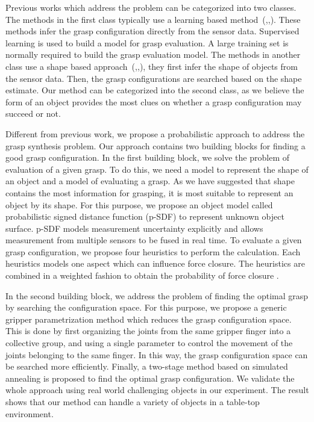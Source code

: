 Previous works which address the problem can be categorized into two classes. The methods in the first class typically use a learning based method~(\cite{Kroemer2010},\cite{Tegin2009},\cite{Stulp2011}). These methods infer the grasp configuration directly from the sensor data. Supervised learning is used to build a model for grasp evaluation. A large training set is normally required to build the grasp evaluation model. The methods in another class use a shape based approach~(\cite{Miller2003},\cite{Przybylski2011},\cite{Goldfeder2007}), they first infer the shape of objects from the sensor data. Then, the grasp configurations are searched based on the shape estimate. Our method can be categorized into the second class, as we believe the form of an object provides the most clues on whether a grasp configuration may succeed or not. 

Different from previous work, we propose a probabilistic approach to address the grasp synthesis problem. Our approach contains two building blocks for finding a good grasp configuration. In the first building block, we solve the problem of evaluation of a given grasp. To do this, we need a model to represent the shape of an object and a model of evaluating a grasp. As we have suggested that shape contains the most information for grasping, it is most suitable to represent an object by its shape. For this purpose, we propose an object model called
 probabilistic signed distance function (p-SDF) to represent unknown object surface. p-SDF models measurement uncertainty explicitly and allows measurement
 from multiple sensors to be fused in real time. To evaluate a given grasp configuration, we propose four heuristics to perform the calculation. Each heuristics models one aspect which can influence force closure. The heuristics are combined in a weighted fashion to obtain the probability of force closure . 

In the second building block, we address the problem of finding the optimal grasp by searching the configuration space. For this purpose, we propose a generic gripper parametrization method which reduces the grasp configuration space. This is done by first organizing the joints from the same gripper finger into a collective group, and using a single parameter to control the movement of the joints belonging to the same finger. In this way, the grasp configuration space can be searched more efficiently. Finally, a  two-stage method based on simulated annealing is proposed to find the optimal grasp configuration. We validate the whole approach using real world challenging objects in our experiment. The result shows that our method can handle a variety of objects in a table-top environment. 
